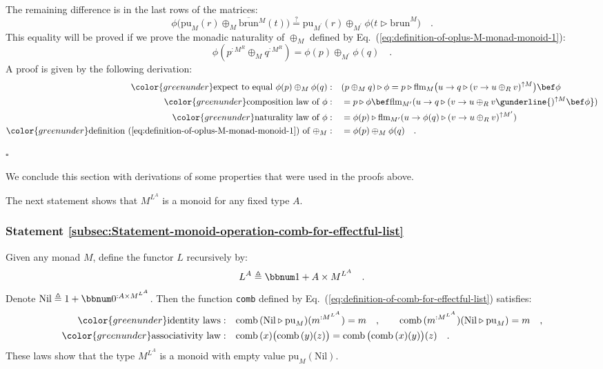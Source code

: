 The remaining difference is in the last rows of the matrices:
\[
\phi\big(\text{pu}_{M}(r)\oplus_{M}\overline{\text{brun}}{}^{M}(t)\big)\overset{?}{=}\text{pu}_{M^{\prime}}(r)\oplus_{M^{\prime}}\phi\big(t\triangleright\text{brun}^{M}\big)\quad.
\]
This equality will be proved if we prove the monadic
naturality of $\oplus_{M}$ defined by Eq.~(\ref{eq:definition-of-oplus-M-monad-monoid-1}):
\[
\phi(p^{:M^{R}}\oplus_{M}q^{:M^{R}})=\phi(p)\oplus_{M^{\prime}}\phi(q)\quad.
\]
A proof is given by the following derivation:
\begin{align*}
{\color{greenunder}\text{expect to equal }\phi(p)\oplus_{M}\phi(q):}\quad & (p\oplus_{M}q)\triangleright\phi=p\triangleright\text{flm}_{M}\big(u\rightarrow q\triangleright(v\rightarrow u\oplus_{R}v)^{\uparrow M}\big)\bef\phi\\
{\color{greenunder}\text{composition law of }\phi:}\quad & =p\triangleright\phi\bef\text{flm}_{M^{\prime}}(u\rightarrow q\triangleright(v\rightarrow u\oplus_{R}v\gunderline{)^{\uparrow M}\bef\phi})\\
{\color{greenunder}\text{naturality law of }\phi:}\quad & =\phi(p)\triangleright\text{flm}_{M^{\prime}}(u\rightarrow\phi(q)\triangleright(v\rightarrow u\oplus_{R}v)^{\uparrow M^{\prime}})\\
{\color{greenunder}\text{definition~(\ref{eq:definition-of-oplus-M-monad-monoid-1}) of }\oplus_{M}:}\quad & =\phi(p)\oplus_{M}\phi(q)\quad.
\end{align*}

$\square$

We conclude this section with derivations of some properties that
were used in the proofs above. 

The next statement shows that $M^{L^{A}}$ is a monoid for any fixed
type $A$.

\subsubsection{Statement \label{subsec:Statement-monoid-operation-comb-for-effectful-list}\ref{subsec:Statement-monoid-operation-comb-for-effectful-list}}

Given any monad $M$, define the functor $L$ recursively by:
\[
L^{A}\triangleq\bbnum 1+A\times M^{L^{A}}\quad.
\]
Denote $\text{Nil}\triangleq1+\bbnum 0^{:A\times M^{L^{A}}}$. Then
the function \lstinline!comb! defined by Eq.~(\ref{eq:definition-of-comb-for-effectful-list})
satisfies:
\begin{align*}
{\color{greenunder}\text{identity laws}:}\quad & \text{comb}\,(\text{Nil}\triangleright\text{pu}_{M})(m^{:M^{L^{A}}})=m\quad,\quad\quad\text{comb}\,(m^{:M^{L^{A}}})(\text{Nil}\triangleright\text{pu}_{M})=m\quad,\\
{\color{greenunder}\text{associativity law}:}\quad & \text{comb}\,(x)\big(\text{comb}\,(y)(z)\big)=\text{comb}\,\big(\text{comb}\,(x)(y)\big)(z)\quad.
\end{align*}
These laws show that the type $M^{L^{A}}$ is a monoid with empty
value $\text{pu}_{M}(\text{Nil})$.

